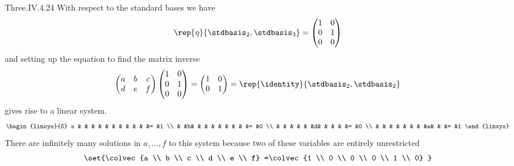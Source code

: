 \begin{ans}{Three.IV.4.24}
      With respect to the standard bases we have
      \begin{equation*}
        \rep{\eta}{\stdbasis_2,\stdbasis_3}
        =\begin{pmatrix}
          1  &0  \\
          0  &1  \\
          0  &0
        \end{pmatrix}
      \end{equation*}
      and setting up the equation to find the matrix inverse
      \begin{equation*}
        \begin{pmatrix}
          a &b &c \\
          d &e &f
        \end{pmatrix}
        \begin{pmatrix}
          1 &0  \\
          0 &1  \\
          0 &0
        \end{pmatrix}
        =\begin{pmatrix}
          1 &0  \\
          0 &1
        \end{pmatrix}
        =\rep{\identity}{\stdbasis_2,\stdbasis_2}
      \end{equation*}
      gives rise to a linear system.
      \begin{equation*}
        \begin{linsys}{6}
          a & & & & & & & & & & &= &1 \\
            & &b& & & & & & & & &= &0 \\
            & & & & & &d& & & & &= &0 \\
            & & & & & & & &e& & &= &1
        \end{linsys}
      \end{equation*}
      There are infinitely many solutions in $a,\ldots,f$
      to this system because two of these variables are entirely unrestricted
      \begin{equation*}
        \set{\colvec{a \\ b \\ c \\ d \\ e \\ f}
             =\colvec{1 \\ 0 \\ 0 \\ 0 \\ 1 \\ 0}
}
\end{equation*}
\end{ans}
